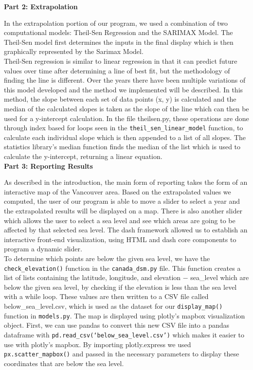 \documentclass[fontsize=11pt]{article}
\begin{document}
    \textbf{Part 2: Extrapolation}

    \hspace{\parindent}In the extrapolation portion of our program, we used a combination of two computational models: Theil-Sen Regression and the SARIMAX Model. The Theil-Sen model first determines the inputs in the final display which is then graphically represented by the Sarimax Model. \\

    Theil-Sen regression is similar to linear regression in that it can predict future values over time after determining a line of best fit, but the methodology of finding the line is different. Over the years there have been multiple variations of this model developed and the method we implemented will be described. In this method, the slope between each set of data points (x, y) is calculated and the median of the calculated slopes is taken as the slope of the line which can then be used for a y-intercept calculation. In the file theilsen.py, these operations are done through index based for loops seen in the \texttt{theil\_sen\_linear\_model} function, to calculate each individual slope which is then appended to a list of all slopes. The statistics library’s median function finds the median of the list which is used to calculate the y-intercept, returning a linear equation. \\


    \textbf{Part 3: Reporting Results}

    \hspace{\parindent}As described in the introduction, the main form of reporting takes the form of an interactive map of the Vancouver area. Based on the extrapolated values we computed, the user of our program is able to move a slider to select a year and the extrapolated results will be displayed on a map. There is also another slider which allows the user to select a sea level and see which areas are going to be affected by that selected sea level. The dash framework allowed us to establish an interactive front-end visualization, using HTML and dash core components to program a dynamic slider. \\

    To determine which points are below the given sea level, we have the \texttt{check\_elevation()} function in the \texttt{canada\_dsm.py} file. This function creates a list of lists containing the latitude, longitude, and elevation $-$ sea\_level which are below the given sea level, by checking if the elevation is less than the sea level with a while loop. These values are then written to a CSV file called below\_sea\_level.csv, which is used as the dataset for our \texttt{display\_map()} function in \texttt{models.py}. The map is displayed using plotly’s mapbox visualization object. First, we can use pandas to convert this new CSV file into a pandas dataframe with \texttt{pd.read\_csv(‘below\_sea\_level.csv’)} which makes it easier to use with plotly’s mapbox. By importing plotly.express we used \texttt{px.scatter\_mapbox()} and passed in the necessary parameters to display these coordinates that are below the sea level. \\
\end{document}

